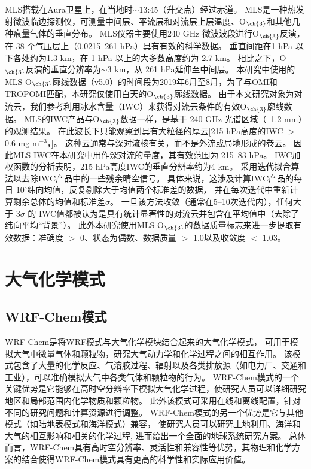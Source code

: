 MLS搭载在Aura卫星上，在当地时$\sim$13:45（升交点）经过赤道。
MLS是一种热发射微波临边探测仪，可测量中间层、平流层和对流层上层温度、O$_{\ch{3}}$和其他几种痕量气体的垂直分布。
MLS仪器主要使用240 GHz 微波波段进行O$_{\ch{3}}$反演，在 38 个气压层上（0.0215--261 hPa）具有有效的科学数据。
垂直间距在1 hPa 以下各处约为1.3 km，在 1 hPa 以上的大多数高度约为 2.7 km。
相比之下，O$_{\ch{3}}$反演的垂直分辨率为$\sim$3 km，从 261 hPa延伸至中间层。
本研究中使用的MLS O$_{\ch{3}}$廓线数据（v5.0）的时间段为2019年6月至8月，为了与OMI和TROPOMI匹配，本研究仅使用白天的O$_{\ch{3}}$廓线数据。
由于本文研究对象为对流云，我们参考\citet{Livesey.2013}利用冰水含量（IWC）来获得对流云条件的有效O$_{\ch{3}}$廓线数据。
MLS的IWC产品与O$_{\ch{3}}$数据一样，是基于 240 GHz 光谱区域（~1.2 mm）的观测结果。
在此波长下只能观察到具有大粒径的厚云[215 hPa高度的IWC $>$ 0.6 mg m$^{-3}$，\citet{Wu.2008}]。 这种云通常与深对流核有关，而不是外流或局地形成的卷云。
因此MLS IWC在本研究中用作深对流的量度，其有效范围为 215--83 hPa。
IWC加权函数的分析表明，215 hPa高度IWC的垂直分辨率约为4 km\citep{Wu.2008}。
\citet{Livesey.2013}采用迭代拟合算法以去除IWC产品中的一些残余晴空信号。
具体来说，这涉及计算IWC产品的每日 10$^{\circ}$纬向均值，反复剔除大于均值两个标准差的数据，
并在每次迭代中重新计算剩余总体的均值和标准差$\sigma$。
一旦该方法收敛（通常在5--10次迭代内），任何大于 3$\sigma$ 的 IWC值都被认为是具有统计显著性的对流云并包含在平均值中（去除了纬向平均“背景”）。
此外本研究使用MLS O$_{\ch{3}}$的数据质量标志来进一步提取有效数据：准确度 $>$ 0、状态为偶数、数据质量 $>$ 1.0以及收敛度 $<$ 1.03。


\section{大气化学模式}

\subsection{WRF-Chem模式}

WRF-Chem是将WRF模式与大气化学模块结合起来的大气化学模式，
可用于模拟大气中微量气体和颗粒物，研究大气动力学和化学过程之间的相互作用。
该模式包含了大量的化学反应、气溶胶过程、辐射以及各类排放源（如电力厂、交通和工业），可以准确模拟大气中各类气体和颗粒物的行为。
WRF-Chem模式的一个关键优势是它能够在高时空分辨率下模拟大气化学过程，使研究人员可以详细研究地区和局部范围内化学物质和颗粒物。
此外该模式可采用在线和离线配置，针对不同的研究问题和计算资源进行调整。
WRF-Chem模式的另一个优势是它与其他模式（如陆地表模式和海洋模式）兼容，
使研究人员可以研究土地利用、海洋和大气的相互影响和相关的化学过程,
进而给出一个全面的地球系统研究方案。
总体而言，WRF-Chem具有高时空分辨率、灵活性和兼容性等优势，其物理和化学方案的结合使得WRF-Chem模式具有更高的科学性和实际应用价值。

